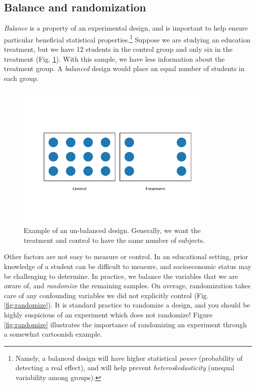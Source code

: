 \documentclass{tufte-handout}
\begin{document}
\subsection{Balance and randomization}
\label{sec:org906eff0}
\emph{Balance} is a property of an experimental design, and is important to help
ensure particular beneficial statistical properties.\footnote{Namely, a balanced
design will have higher statistical \emph{power} (probability of detecting a real
effect), and will help prevent \emph{heteroskedasticity} (unequal variability among
groups).} Suppose we are studying an education treatment, but we have 12
students in the control group and only six in the treatment (Fig.
\ref{fig:unbalanced}). With this sample, we have less information about the
treatment group. A \emph{balanced} design would place an equal number of students in
each group.

\begin{figure}[!ht]
  \centering
  \includegraphics[width=0.85\textwidth]{images/balance}
  \caption{Example of an un-balanced design. Generally, we want the treatment
  and control to have the same number of subjects.}
  \label{fig:unbalanced}
\end{figure}


Other factors are not easy to measure or control. In an educational setting,
prior knowledge of a student can be difficult to measure, and socioeconomic
status may be challenging to determine. In practice, we balance the variables
that we are aware of, and \emph{randomize} the remaining samples. On average,
randomization takes care of any confounding variables we did not explicitly
control (Fig. \ref{fig:randomize}). It is standard practice to randomize a
design, and you should be highly suspicious of an experiment which does not
randomize! Figure \ref{fig:randomize} illustrates the importance of randomizing
an experiment through a somewhat cartoonish example.
\end{document}
